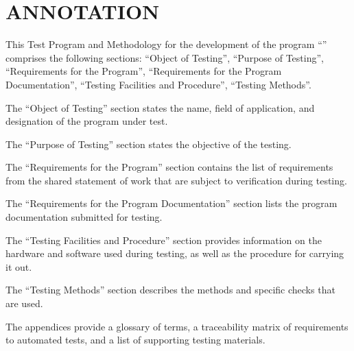 \documentclass[12pt,a4paper]{extarticle}
\begin{document}
\sloppy





\section*{ANNOTATION}

This Test Program and Methodology for the development of the program \enquote{\hseProjectName} comprises the following sections: \enquote{Object of Testing}, \enquote{Purpose of Testing}, \enquote{Requirements for the Program}, \enquote{Requirements for the Program Documentation}, \enquote{Testing Facilities and Procedure}, \enquote{Testing Methods}.

The \enquote{Object of Testing} section states the name, field of application, and designation of the program under test.

The \enquote{Purpose of Testing} section states the objective of the testing.

The \enquote{Requirements for the Program} section contains the list of requirements from the shared statement of work that are subject to verification during testing.

The \enquote{Requirements for the Program Documentation} section lists the program documentation submitted for testing.

The \enquote{Testing Facilities and Procedure} section provides information on the hardware and software used during testing, as well as the procedure for carrying it out.

The \enquote{Testing Methods} section describes the methods and specific checks that are used.

The appendices provide a glossary of terms, a traceability matrix of requirements to automated tests, and a list of supporting testing materials.
\end{document}
